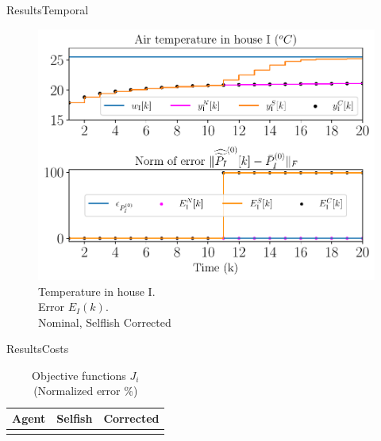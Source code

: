 \documentclass[handout,aspectratio=169]{beamer}
\begin{document}
\begin{frame}{Results}{Temporal}
  \centering
  \begin{overlayarea}{1\textwidth}{.5\textwidth}
  \begin{figure}[h]
    \centering
    \includegraphics[width=.45\textwidth,trim=0 .3cm 0 .2cm,clip]{../img/resilient_ineq/ErrorWX_command_normErrH.pdf}
    \caption*{Temperature in house I. \\Error  $E_{I}(k)$.\\ {} Nominal, {} Selflish {} Corrected}
  \end{figure}


  \end{overlayarea}

\end{frame}

\begin{frame}{Results}{Costs}
  \begin{table}[h]
    \centering
    \caption*{Objective functions $J_{i}$ (Normalized error \%)}\label{tab:eq_costsGlobalLocal}
    \begin{tabular}[t]{crr}
      \toprule
      Agent  & Selfish & Corrected\\
      \midrule
      \\
      \bottomrule
    \end{tabular}
  \end{table}
\end{frame}
\end{document}
